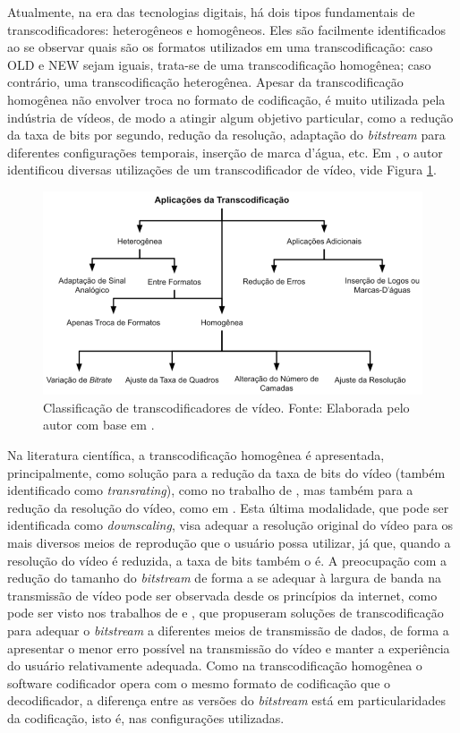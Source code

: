 Atualmente, na era das tecnologias digitais, há dois tipos fundamentais de transcodificadores: heterogêneos e homogêneos. Eles são facilmente identificados ao se observar quais são os formatos utilizados em uma transcodificação: caso OLD e NEW sejam iguais, trata-se de uma transcodificação homogênea; caso contrário, uma transcodificação heterogênea. Apesar da transcodificação homogênea não envolver troca no formato de codificação, é muito utilizada pela indústria de vídeos, de modo a atingir algum objetivo particular, como a redução da taxa de bits por segundo, redução da resolução, adaptação do \textit{bitstream} para diferentes configurações temporais, inserção de marca d’água, etc. Em \citet{bib:modosTranscodificacao}, o autor identificou diversas utilizações de um transcodificador de vídeo, vide Figura \ref{fig:4}.

\begin{figure}
    \centering
    \includegraphics[width=\textwidth]{FIGURES/fig_4.png}
    \caption{Classificação de transcodificadores de vídeo. Fonte: Elaborada pelo autor com base em \citet{bib:modosTranscodificacao}.}
    \label{fig:4}
\end{figure}

Na literatura científica, a transcodificação homogênea é apresentada, principalmente, como solução para a redução da taxa de bits do vídeo (também identificado como \textit{transrating}), como no trabalho de \citet{bib:nam_2006}, mas também para a redução da resolução do vídeo, como em \citet{bib:nguyen_2015}. Esta última modalidade, que pode ser identificada como \textit{downscaling}, visa adequar a resolução original do vídeo para os mais diversos meios de reprodução que o usuário possa utilizar, já que, quando a resolução do vídeo é reduzida, a taxa de bits também o é. A preocupação com a redução do tamanho do \textit{bitstream} de forma a se adequar à largura de banda na transmissão de vídeo pode ser observada desde os princípios da internet, como pode ser visto nos trabalhos de \citet{bib:shen_1997} e \citet{bib:swann_1996}, que propuseram soluções de transcodificação para adequar o \textit{bitstream} a diferentes meios de transmissão de dados, de forma a apresentar o menor erro possível na transmissão do vídeo e manter a experiência do usuário relativamente adequada. Como na transcodificação homogênea o software codificador opera com o mesmo formato de codificação que o decodificador, a diferença entre as versões do \textit{bitstream} está em particularidades da codificação, isto é, nas configurações utilizadas.

